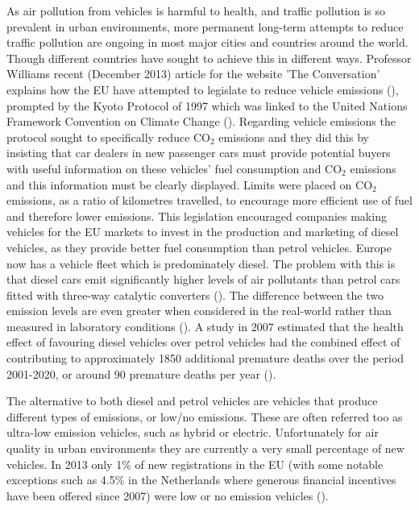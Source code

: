 As air pollution from vehicles is harmful to health, and traffic pollution is so prevalent in urban environments, more permanent long-term attempts to reduce traffic pollution are ongoing in most major cities and countries around the world. Though different countries have sought to achieve this in different ways. Professor Williams recent (December 2013) article for the website 'The Conversation' explains how the EU have attempted to legislate to reduce vehicle emissions (\cite{Williams2013}), prompted by the Kyoto Protocol of 1997 which was linked to the United Nations Framework Convention on Climate Change (\cite{UnitedNations1998}). Regarding vehicle emissions the protocol sought to specifically reduce CO$_{2}$ emissions and they did this by insisting that car dealers in new passenger cars must provide potential buyers with useful information on these vehicles' fuel consumption and CO$_{2}$ emissions and this information must be clearly displayed. Limits were placed on CO$_{2}$ emissions, as a ratio of kilometres travelled, to encourage more efficient use of fuel and therefore lower emissions. This legislation encouraged companies making vehicles for the EU markets to invest in the production and marketing of diesel vehicles, as they provide better fuel consumption than petrol vehicles. Europe now has a vehicle fleet which is predominately diesel. The problem with this is that diesel cars emit significantly higher levels of air pollutants than petrol cars fitted with three-way catalytic converters (\cite{Williams2013}). The difference between the two emission levels are even greater when considered in the real-world rather than measured in laboratory conditions (\cite{Carslaw2011}). A study in 2007 estimated that the health effect of favouring diesel vehicles over petrol vehicles had the combined effect of contributing to approximately 1850 additional premature deaths over the period 2001-2020, or around 90 premature deaths per year (\cite{Mazzi2007}).

The alternative to both diesel and petrol vehicles are vehicles that produce different types of emissions, or low/no emissions. These are often referred too as ultra-low emission vehicles, such as hybrid or electric. Unfortunately for air quality in urban environments they are currently a very small percentage of new vehicles. In 2013 only 1\% of new registrations in the EU (with some notable exceptions such as 4.5\% in the Netherlands where generous financial incentives have been offered since 2007) were low or no emission vehicles (\cite{Transportation2013}).

